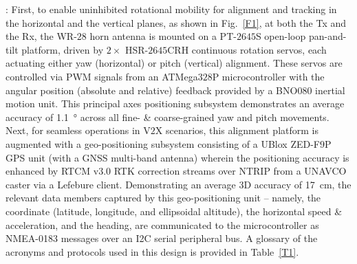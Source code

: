 \documentclass[12pt, draftcls, onecolumn]{IEEEtran}
\begin{document}
: First, to enable uninhibited rotational mobility for alignment and tracking in the horizontal and the vertical planes, as shown in Fig.~\ref{F1}, at both the Tx and the Rx, the WR-$28$ horn antenna is mounted on a PT-$2645$S open-loop pan-and-tilt platform, driven by $2{\times}$ HSR-$2645$CRH continuous rotation servos, each actuating either yaw (horizontal) or pitch (vertical) alignment. These servos are controlled via PWM signals from an ATMega$328$P microcontroller with the angular position (absolute and relative) feedback provided by a BNO$080$ inertial motion unit. This principal axes positioning subsystem demonstrates an average accuracy of \SI{1.1}{\degree} across all fine- \& coarse-grained yaw and pitch movements. Next, for seamless operations in V$2$X scenarios, this alignment platform is augmented with a geo-positioning subsystem consisting of a UBlox ZED-F$9$P GPS unit (with a GNSS multi-band antenna) wherein the positioning accuracy is enhanced by RTCM v$3.0$ RTK correction streams over NTRIP from a UNAVCO caster via a Lefebure client. Demonstrating an average $3$D accuracy of \SI{17}{\centi\meter}, the relevant data members captured by this geo-positioning unit -- namely, the coordinate (latitude, longitude, and ellipsoidal altitude), the horizontal speed \& acceleration, and the heading, are communicated to the microcontroller as NMEA-0183 messages over an I2C serial peripheral bus. A glossary of the acronyms and protocols used in this design is provided in Table~\ref{T1}.
\end{document}
